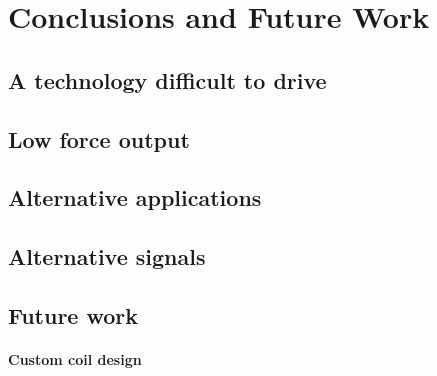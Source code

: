 
\chapter{Conclusions and Future Work}
\label{Chapter6}
    
\section{A technology difficult to drive}

\section{Low force output}

\section{Alternative applications}

\section{Alternative signals}

\section{Future work}

\subsubsection{Custom coil design}
